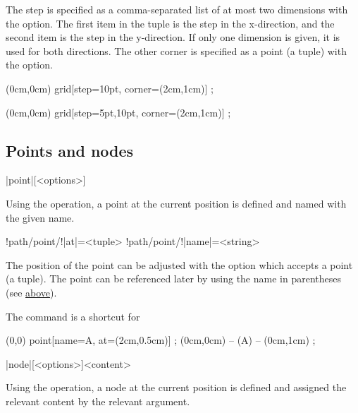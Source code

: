 \documentclass[a4paper]{article}
\begin{document}
{{The step is specified as a comma-separated list of at most two dimensions with the  option. The first item in the tuple is the step in the x-direction, and the second item is the step in the y-direction. If only one dimension is given, it is used for both directions. The other corner is specified as a point (a tuple) with the  option. 

\begin{codeexamplecolumns}
\begin{qdraw}
  \path[stroke] (0cm,0cm)
    grid[step={10pt}, corner={(2cm,1cm)}] ;
\end{qdraw}
\end{codeexamplecolumns}

\begin{codeexamplecolumns}
\begin{qdraw}
  \path[stroke] (0cm,0cm)
    grid[step={5pt,10pt}, corner={(2cm,1cm)}] ;
\end{qdraw}
\end{codeexamplecolumns}

\subsection{Points and nodes}

\begin{macrodef}
|point|[<options>]
\end{macrodef}
Using the  operation, a point at the current position is defined and named with the given name.

\begin{macrodef}
!path/point/!|at|={<tuple>}
!path/point/!|name|={<string>}
\end{macrodef}
The position of the point can be adjusted with the  option which accepts a point (a tuple). The point can be referenced later by using the name in parentheses (see \hyperlink{macro:point}{above}). 

The command \macro{\point} is a shortcut for 

\begin{codeexamplecolumns}
\begin{qdraw}
  \path (0,0) point[name={A}, at={(2cm,0.5cm)}] ;
  \path[stroke] (0cm,0cm) -- (A) -- (0cm,1cm) ;
\end{qdraw}
\end{codeexamplecolumns}

\begin{macrodef}
|node|[<options>]{<content>}
\end{macrodef}
Using the  operation, a node at the current position is defined and assigned the relevant content by the relevant argument.

}}
\end{document}
